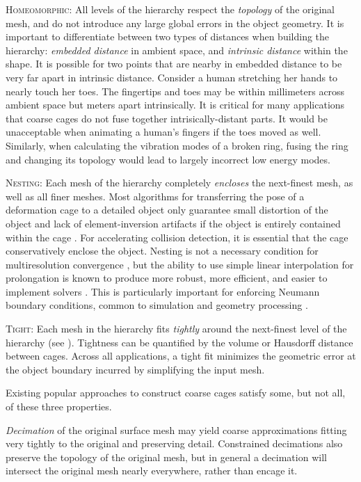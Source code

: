 \noindent \textsc{Homeomorphic}: All levels of the hierarchy respect the
\emph{topology} of the original mesh, and do not introduce any large global
errors in the object geometry. It is important to differentiate between two
types of distances when building the hierarchy: \emph{embedded distance} in
ambient space, and \emph{intrinsic distance} within the shape.
%
It is possible for two points that are nearby in embedded distance to be very
far apart in intrinsic distance. Consider a human stretching her hands to
nearly touch her toes. The fingertips and toes may be within millimeters across
ambient space but meters apart intrinsically.
%
It is critical for many applications that coarse cages do not fuse together
intrisically-distant parts. It would be unacceptable when animating a 
human's fingers if the toes moved as well.
%
Similarly, when calculating the vibration modes of a broken ring, fusing the
ring and changing its topology would lead to largely incorrect low energy
modes.

\noindent \textsc{Nesting}:
%
Each mesh of the hierarchy completely \emph{encloses} the next-finest mesh, as
well as all finer meshes.
%
Most algorithms for transferring the pose of a deformation cage to a detailed
object only guarantee small distortion of the object and lack of
element-inversion artifacts if the object is entirely contained within the cage
\cite{HarmonicCoodinates07,Ben-Chen:2009:VHM}.
%
For accelerating collision detection, it is essential that the cage
conservatively enclose the object.
%
Nesting is not a necessary condition for multiresolution convergence
\cite{Chan96overlappingschwarz}, but the ability to use simple linear interpolation
for prolongation is known to produce more robust, more
efficient, and easier to implement solvers
\cite{chan2000robust,dickopf2010multilevel}.
%
This is particularly important for enforcing Neumann boundary conditions,
common to simulation and geometry processing \cite{chan1999boundary}.

\noindent \textsc{Tight}:
%
Each mesh in the hierarchy fits \emph{tightly} around the next-finest level of
the hierarchy (see ).
%
Tightness can be quantified by the volume or Hausdorff distance between cages.
%
Across all applications, a tight fit minimizes the geometric error at the
object boundary incurred by simplifying the input mesh.

Existing popular approaches to construct coarse cages satisfy some, but not
all, of these three properties.

\emph{Decimation} of the original surface mesh may yield coarse
approximations fitting very tightly to the original and preserving detail.
%
Constrained decimations also preserve the topology of the original mesh, but in
general a decimation will intersect the original mesh nearly everywhere, rather
than encage it.

